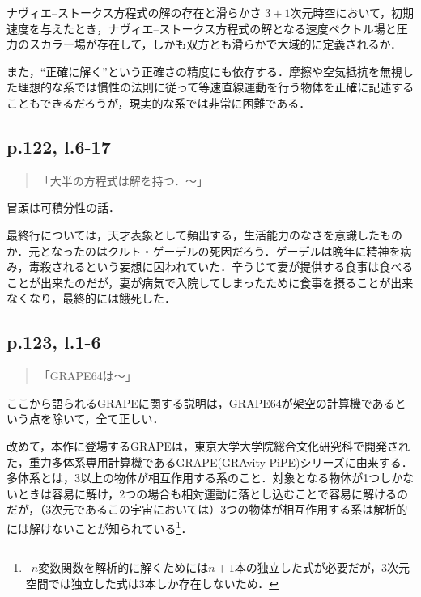 \documentclass[10pt, a5paper, twoside]{ltjsarticle}
\newcommand{\hyphen}{\insertkanjiskip--\insertkanjiskip}
\begin{document}
            \begin{prb}{ナヴィエ\hyphen ストークス方程式の解の存在と滑らかさ}{}
                $3+1$次元時空において，初期速度を与えたとき，ナヴィエ\hyphen ストークス方程式の解となる速度ベクトル場と圧力のスカラー場が存在して，しかも双方とも滑らかで大域的に定義されるか．
            \end{prb}

            また，“正確に解く”という正確さの精度にも依存する．摩擦や空気抵抗を無視した理想的な系では慣性の法則に従って等速直線運動を行う物体を正確に記述することもできるだろうが，現実的な系では非常に困難である．

        \subsection{p.122, l.6-17}\label{deathofgodel}

            \begin{quote}
                「大半の方程式は解を持つ．〜」
            \end{quote}

            冒頭は可積分性の話．

            最終行については，天才表象として頻出する，生活能力のなさを意識したものか．元となったのはクルト・ゲーデルの死因だろう．ゲーデルは晩年に精神を病み，毒殺されるという妄想に囚われていた．辛うじて妻が提供する食事は食べることが出来たのだが，妻が病気で入院してしまったために食事を摂ることが出来なくなり，最終的には餓死した\cite{godel}．

        \subsection{p.123, l.1-6}\label{grape}

            \begin{quote}
                「GRAPE64は〜」
            \end{quote}

            ここから語られるGRAPEに関する説明は，GRAPE64が架空の計算機であるという点を除いて，全て正しい．

            改めて，本作に登場するGRAPEは，東京大学大学院総合文化研究科で開発された，重力多体系専用計算機であるGRAPE(GRAvity PiPE)シリーズに由来する．多体系とは，3以上の物体が相互作用する系のこと．対象となる物体が1つしかないときは容易に解け，2つの場合も相対運動に落とし込むことで容易に解けるのだが，（3次元であるこの宇宙においては）3つの物体が相互作用する系は解析的には解けないことが知られている\footnote{\because \, $n$変数関数を解析的に解くためには$n+1$本の独立した式が必要だが，3次元空間では独立した式は3本しか存在しないため．}．
\end{document}
